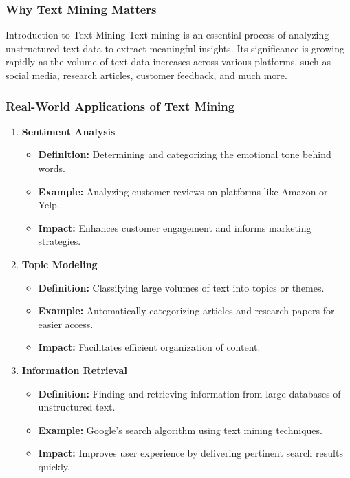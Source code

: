 \documentclass[aspectratio=169]{beamer}
\begin{document}
\begin{frame}[fragile]
    \frametitle{Why Text Mining Matters}
    \begin{block}{Introduction to Text Mining}
        Text mining is an essential process of analyzing unstructured text data to extract meaningful insights. Its significance is growing rapidly as the volume of text data increases across various platforms, such as social media, research articles, customer feedback, and much more.
    \end{block}
\end{frame}

\begin{frame}[fragile]
    \frametitle{Real-World Applications of Text Mining}
    \begin{enumerate}
        \item \textbf{Sentiment Analysis}
            \begin{itemize}
                \item \textbf{Definition:} Determining and categorizing the emotional tone behind words.
                \item \textbf{Example:} Analyzing customer reviews on platforms like Amazon or Yelp.
                \item \textbf{Impact:} Enhances customer engagement and informs marketing strategies.
            \end{itemize}
        
        \item \textbf{Topic Modeling}
            \begin{itemize}
                \item \textbf{Definition:} Classifying large volumes of text into topics or themes.
                \item \textbf{Example:} Automatically categorizing articles and research papers for easier access.
                \item \textbf{Impact:} Facilitates efficient organization of content.
            \end{itemize}
        
        \item \textbf{Information Retrieval}
            \begin{itemize}
                \item \textbf{Definition:} Finding and retrieving information from large databases of unstructured text.
                \item \textbf{Example:} Google’s search algorithm using text mining techniques.
                \item \textbf{Impact:} Improves user experience by delivering pertinent search results quickly.
            \end{itemize}
    \end{enumerate}
\end{frame}
\end{document}
